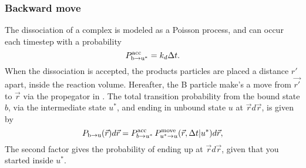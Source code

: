 \subsubsection{Backward move}
The dissociation of a complex is modeled as a Poisson process, and can occur each timestep with a probability
\begin{equation}
 P^{\rm acc}_{\rm b \to u^*} = k_d \Delta t.
\end{equation}
When the dissociation is accepted, the products particles are placed a distance $r'$ apart, inside the reaction volume. Hereafter, the B particle make's a move from $\vec{r'}$ to $\vec{r}$ via the propegator in . The total transition probability from the bound state $b$, via the intermediate state $u^*$, and ending in unbound state $u$ at $\vec{r}d\vec{r}$, is given by
\begin{equation}
P_{ \rm{b} \to \rm{u}}(\vec{r})d\vec{r} =  P^{\rm acc}_{b \to u^*}\,P^{\rm move}_{u^* \to u}(\vec{r},\Delta t|u^*)d\vec{r},
\end{equation}
The second factor gives the probability of ending up at $\vec{r}d\vec{r}$, given that you started inside $u^*$.

